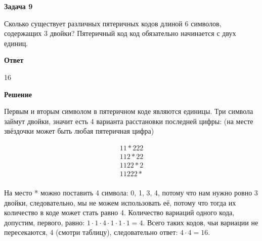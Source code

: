 \documentclass[14pt,a4paper]{article}
\begin{document}
\textbf{Задача 9}

Сколько существует различных пятеричных кодов длиной 6 символов, содержащих 3 двойки? Пятеричный код код обязательно начинается с двух единиц.

\textbf{Ответ}

16

\textbf{Решение}

Первым и вторым символом в пятеричном коде являются единицы. Три символа займут двойки, значит есть 4 варианта расстановки последней цифры: (на месте звёздочки может быть любая пятеричная цифра)

$$
\begin{array}{c}
	11*222 \\
	112*22 \\
	1122*2 \\
	11222* \\
\end{array}
$$

На место * можно поставить 4 символа: 0, 1, 3, 4, потому что нам нужно ровно 3 двойки, следовательно, мы не можем использовать её, потому что тогда их количество в коде может стать равно 4. Количество вариаций одного кода, допустим, первого, равно: $1 \cdot 1 \cdot 4 \cdot 1 \cdot 1 \cdot 1 = 4$. Всего таких кодов, чьи вариации не пересекаются, 4 (смотри таблицу), следовательно ответ: $4 \cdot 4 = 16$. 

\newpage
\end{document}
